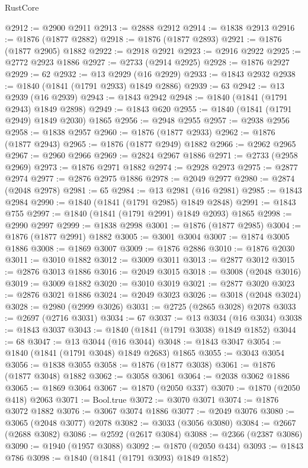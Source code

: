 \begin{lexlean}{RustCore}
\begin{coremodule}
@2912 := @2900 @2911
@2913 := @2888 @2912
@2914 := @1838 @2913
@2916 := @1876 (@1877 @2882)
@2918 := @1876 (@1877 @2893)
@2921 := @1876 (@1877 @2905) @1882
@2922 := @2918 @2921
@2923 := @2916 @2922
@2925 := @2772 @2923 @1886
@2927 := @2733 (@2914 @2925)
@2928 := @1876 @2927
@2929 := 62
@2932 := @13 @2929 (@16 @2929)
@2933 := @1843 @2932
@2938 := @1840 (@1841 (@1791 @2933) @1849 @2886)
@2939 := 63
@2942 := @13 @2939 (@16 @2939)
@2943 := @1843 @2942
@2948 := @1840 (@1841 (@1791 @2943) @1849 @2898)
@2949 := @1843 @620
@2955 := @1840 (@1841 (@1791 @2949) @1849 @2030) @1865
@2956 := @2948 @2955
@2957 := @2938 @2956
@2958 := @1838 @2957
@2960 := @1876 (@1877 @2933)
@2962 := @1876 (@1877 @2943)
@2965 := @1876 (@1877 @2949) @1882
@2966 := @2962 @2965
@2967 := @2960 @2966
@2969 := @2824 @2967 @1886
@2971 := @2733 (@2958 @2969)
@2973 := @1876 @2971 @1882
@2974 := @2928 @2973
@2975 := @2877 @2974
@2977 := @2876 @2975 @1886
@2978 := @2049 @2977
@2980 := @2874 (@2048 @2978)
@2981 := 65
@2984 := @13 @2981 (@16 @2981)
@2985 := @1843 @2984
@2990 := @1840 (@1841 (@1791 @2985) @1849 @2848)
@2991 := @1843 @755
@2997 := @1840 (@1841 (@1791 @2991) @1849 @2093) @1865
@2998 := @2990 @2997
@2999 := @1838 @2998
@3001 := @1876 (@1877 @2985)
@3004 := @1876 (@1877 @2991) @1882
@3005 := @3001 @3004
@3007 := @1874 @3005 @1886
@3008 := @1869 @3007
@3009 := @1876 @2886
@3010 := @1876 @2030
@3011 := @3010 @1882
@3012 := @3009 @3011
@3013 := @2877 @3012
@3015 := @2876 @3013 @1886
@3016 := @2049 @3015
@3018 := @3008 (@2048 @3016)
@3019 := @3009 @1882
@3020 := @3010 @3019
@3021 := @2877 @3020
@3023 := @2876 @3021 @1886
@3024 := @2049 @3023
@3026 := @3018 (@2048 @3024)
@3028 := @2980 (@2999 @3026)
@3031 := @2725 (@2865 @3028) @2078
@3033 := @2697 (@2716 @3031)
@3034 := 67
@3037 := @13 @3034 (@16 @3034)
@3038 := @1843 @3037
@3043 := @1840 (@1841 (@1791 @3038) @1849 @1852)
@3044 := 68
@3047 := @13 @3044 (@16 @3044)
@3048 := @1843 @3047
@3054 := @1840 (@1841 (@1791 @3048) @1849 @2683) @1865
@3055 := @3043 @3054
@3056 := @1838 @3055
@3058 := @1876 (@1877 @3038)
@3061 := @1876 (@1877 @3048) @1882
@3062 := @3058 @3061
@3064 := @2038 @3062 @1886
@3065 := @1869 @3064
@3067 := @1870 (@2050 @337)
@3070 := @1870 (@2050 @418) @2063
@3071 := Bool.true
@3072 := @3070 @3071
@3074 := @1876 @3072 @1882
@3076 := @3067 @3074 @1886
@3077 := @2049 @3076
@3080 := @3065 (@2048 @3077) @2078
@3082 := @3033 (@3056 @3080)
@3084 := @2667 (@2688 @3082)
@3086 := @2592 (@2617 @3084)
@3088 := @2366 (@2387 @3086)
@3090 := @1940 (@1957 @3088)
@3092 := @1870 (@2050 @434)
@3093 := @1843 @786
@3098 := @1840 (@1841 (@1791 @3093) @1849 @1852)

\end{coremodule}
\end{lexlean}
